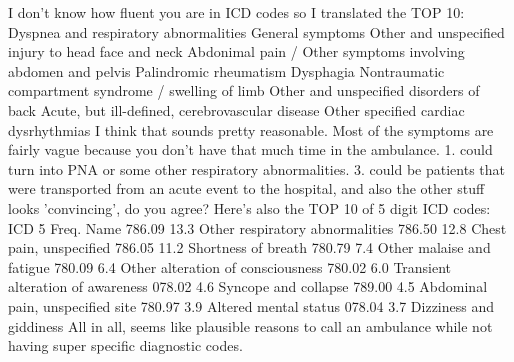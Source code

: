 \markdownRendererInterblockSeparator
{}I don't know how fluent you are in ICD codes so I translated the TOP 10:\markdownRendererInterblockSeparator
{}\markdownRendererOlBeginTight
{}Dyspnea and respiratory abnormalities\markdownRendererOlItemEnd 
{}General symptoms\markdownRendererOlItemEnd 
{}Other and unspecified injury to head face and neck\markdownRendererOlItemEnd 
{}Abdonimal pain / Other symptoms involving abdomen and pelvis\markdownRendererOlItemEnd 
{}Palindromic rheumatism\markdownRendererOlItemEnd 
{}Dysphagia\markdownRendererOlItemEnd 
{}Nontraumatic compartment syndrome / swelling of limb\markdownRendererOlItemEnd 
{}Other and unspecified disorders of back\markdownRendererOlItemEnd 
{}Acute, but ill-defined, cerebrovascular disease\markdownRendererOlItemEnd 
{}Other specified cardiac dysrhythmias I think that sounds pretty reasonable. Most of the symptoms are fairly vague because you don't have that much time in the ambulance. 1. could turn into PNA or some other respiratory abnormalities. 3. could be patients that were transported from an acute event to the hospital, and also the other stuff looks 'convincing', do you agree?\markdownRendererOlItemEnd 
\markdownRendererOlEndTight \markdownRendererInterblockSeparator
{}Here's also the TOP 10 of 5 digit ICD codes:\markdownRendererInterblockSeparator
{}ICD 5 Freq. Name 786.09 13.3\markdownRendererPercentSign{} Other respiratory abnormalities 786.50 12.8\markdownRendererPercentSign{} Chest pain, unspecified 786.05 11.2\markdownRendererPercentSign{} Shortness of breath 780.79 7.4\markdownRendererPercentSign{} Other malaise and fatigue 780.09 6.4\markdownRendererPercentSign{} Other alteration of consciousness 780.02 6.0\markdownRendererPercentSign{} Transient alteration of awareness 078.02 4.6\markdownRendererPercentSign{} Syncope and collapse 789.00 4.5\markdownRendererPercentSign{} Abdominal pain, unspecified site 780.97 3.9\markdownRendererPercentSign{} Altered mental status 078.04 3.7\markdownRendererPercentSign{} Dizziness and giddiness All in all, seems like plausible reasons to call an ambulance while not having super specific diagnostic codes.\relax